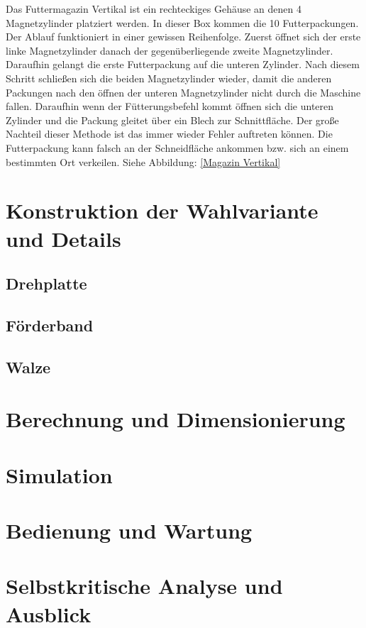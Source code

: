 Das Futtermagazin Vertikal ist ein rechteckiges Gehäuse an denen 4 Magnetzylinder platziert werden. In dieser Box kommen die 10 Futterpackungen. Der Ablauf funktioniert in einer gewissen Reihenfolge. Zuerst öffnet sich der erste linke Magnetzylinder danach der gegenüberliegende zweite Magnetzylinder. Daraufhin gelangt die erste Futterpackung auf die unteren Zylinder. Nach diesem Schritt schließen sich die beiden Magnetzylinder wieder, damit die anderen Packungen nach den öffnen der unteren Magnetzylinder nicht durch die Maschine fallen. Daraufhin wenn der Fütterungsbefehl kommt öffnen sich die unteren Zylinder und die Packung gleitet über ein Blech zur Schnittfläche. Der große Nachteil dieser Methode ist das immer wieder Fehler auftreten können. Die Futterpackung kann falsch an der Schneidfläche ankommen bzw. sich an einem bestimmten Ort verkeilen. Siehe Abbildung: \ref{Magazin Vertikal}

\section{Konstruktion der Wahlvariante und Details}

\subsection{Drehplatte}
\subsection{Förderband}
\subsection{Walze}
\section{Berechnung und Dimensionierung}
\section{Simulation}
\section{Bedienung und Wartung}
\section{Selbstkritische Analyse und Ausblick}

